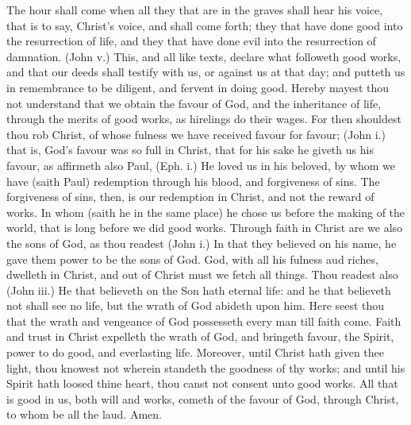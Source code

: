 The hour shall come when all they that are in the graves 
shall hear his voice, that is to say, Christ's voice, and shall 
come forth; they that have done good into the resurrection 
of life, and they that have done evil into the resurrection of 
damnation. (John v.) This, and all like texts, declare 
what followeth good works, and that our deeds shall testify 
with us, or against us at that day; and putteth us in remembrance
to be diligent, and fervent in doing good. 
Hereby mayest thou not understand that we obtain the 
favour of God, and the inheritance of life, through the 
merits of good works, as hirelings do their wages. For 
then shouldest thou rob Christ, of whose fulness we have 
received favour for favour; (John i.) that is, God's favour 
was so full in Christ, that for his sake he giveth us his 
favour, as affirmeth also Paul, (Eph. i.) He loved us in 
his beloved, by whom we have (saith Paul) redemption 
through his blood, and forgiveness of sins. The forgiveness
of sins, then, is our redemption in Christ, and not 
the reward of works. In whom (saith he in the same 
place) he chose us before the making of the world, that is 
long before we did good works. Through faith in Christ 
are we also the sons of God, as thou readest (John i.) In 
that they believed on his name, he gave them power to 
be the sons of God. God, with all his fulness aud 
riches, dwelleth in Christ, and out of Christ must we 
fetch all things. Thou readest also (John iii.) He that believeth
on the Son hath eternal life: and he that believeth 
not shall see no life, but the wrath of God abideth upon 
him. Here seest thou that the wrath and vengeance of 
God possesseth every man till faith come. Faith and 
trust in Christ expelleth the wrath of God, and bringeth 
favour, the Spirit, power to do good, and everlasting life. 
Moreover, until Christ hath given thee light, thou knowest 
not wherein standeth the goodness of thy works; and 
until his Spirit hath loosed thine heart, thou canst not 
consent unto good works. All that is good in us, both 
will and works, cometh of the favour of God, through 
Christ, to whom be all the laud. Amen. 


